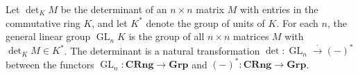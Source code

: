 Let $\det_K M$ be the determinant of an $n \times n$ matrix $M$ with entries in the commutative ring $K$, and let $K^*$ denote the group of units of $K$. For each $n$, the general linear group $\operatorname{GL}_n K$ is the group of all $n \times n$ matrices $M$ with $\det_K M \in K^*$. The determinant is a natural transformation $\det: \operatorname{GL}_n \xrightarrow{\cdot} (-)^*$ between the functors $\operatorname{GL}_n: \mathbf{CRng} \rightarrow \mathbf{Grp}$ and $(-)^*: \mathbf{CRng} \rightarrow \mathbf{Grp}$.